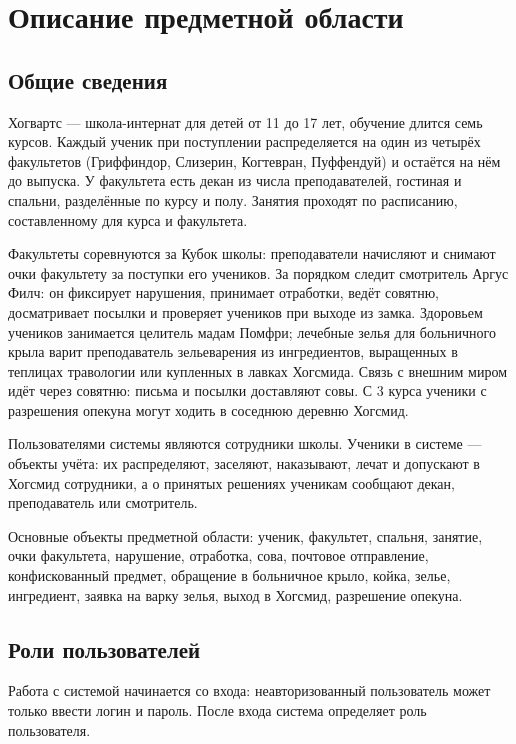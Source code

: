 \documentclass[a4paper,12pt]{article}
\author{}
\date{}
\begin{document}

\newpage
\setcounter{page}{2}
 
\tableofcontents
\newpage
\section{Описание предметной области}


\subsection{Общие сведения}
 
Хогвартс — школа-интернат для детей от 11 до 17 лет, обучение длится семь курсов.
Каждый ученик при поступлении распределяется на один из четырёх факультетов
(Гриффиндор, Слизерин, Когтевран, Пуффендуй) и остаётся на нём до выпуска.
У факультета есть декан из числа преподавателей, гостиная и спальни, разделённые
по курсу и полу. Занятия проходят по расписанию, составленному для курса и факультета.
 
Факультеты соревнуются за Кубок школы: преподаватели начисляют и снимают очки
факультету за поступки его учеников. За порядком следит смотритель Аргус Филч:
он фиксирует нарушения, принимает отработки, ведёт совятню, досматривает посылки
и проверяет учеников при выходе из замка. Здоровьем учеников занимается
целитель мадам Помфри; лечебные зелья для больничного крыла варит преподаватель
зельеварения из ингредиентов, выращенных в теплицах травологии или купленных в лавках
Хогсмида. Связь с внешним миром идёт через совятню: письма и посылки доставляют совы.
С 3 курса ученики с разрешения опекуна могут ходить в соседнюю деревню Хогсмид.
 
Пользователями системы являются сотрудники школы. Ученики в системе — объекты учёта:
их распределяют, заселяют, наказывают, лечат и допускают в Хогсмид сотрудники,
а о принятых решениях ученикам сообщают декан, преподаватель или смотритель.
 
Основные объекты предметной области: ученик, факультет, спальня, занятие, очки
факультета, нарушение, отработка, сова, почтовое отправление, конфискованный предмет,
обращение в больничное крыло, койка, зелье, ингредиент, заявка на варку зелья,
выход в Хогсмид, разрешение опекуна.
 
\subsection{Роли пользователей}
 
Работа с системой начинается со входа: неавторизованный пользователь может только
ввести логин и пароль. После входа система определяет роль пользователя. 
 
\end{document}

